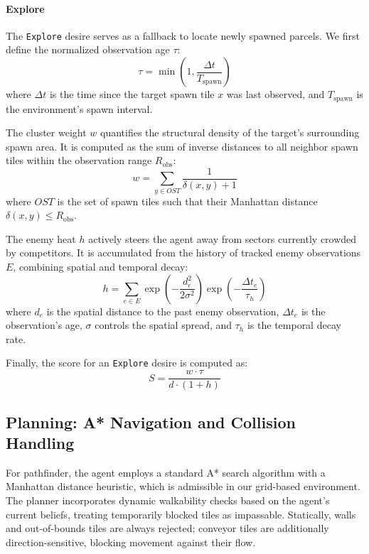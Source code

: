\paragraph{Explore}
The \texttt{Explore} desire serves as a fallback to locate newly spawned parcels. We first define the normalized observation age $\tau$:
\begin{equation*}
  \tau = \min\left(1, \frac{\Delta t}{T_{\text{spawn}}}\right)
\end{equation*}
where $\Delta t$ is the time since the target spawn tile $x$ was last observed, and $T_{\text{spawn}}$ is the environment's spawn interval.

The cluster weight $w$ quantifies the structural density of the target's surrounding spawn area. It is computed as the sum of inverse distances to all neighbor spawn tiles within the observation range $R_{\text{obs}}$:
\begin{equation*}
  w = \sum_{y \in OST} \frac{1}{\delta(x, y) + 1}
\end{equation*}
where $OST$ is the set of spawn tiles such that their Manhattan distance $\delta(x, y) \le R_{\text{obs}}$.

The enemy heat $h$ actively steers the agent away from sectors currently crowded by competitors.
It is accumulated from the history of tracked enemy observations $E$, combining spatial and temporal decay:
\begin{equation*}
  h = \sum_{e \in E} \exp\left(-\frac{d_e^2}{2\sigma^2}\right) \exp\left(-\frac{\Delta t_e}{\tau_h}\right)
\end{equation*}
where $d_e$ is the spatial distance to the past enemy observation, $\Delta t_e$ is the observation's age, $\sigma$ controls the spatial spread, and $\tau_h$ is the temporal decay rate.

Finally, the score for an \texttt{Explore} desire is computed as:
\begin{equation*}
  S = \frac{w \cdot \tau}{d \cdot (1 + h)}
\end{equation*}

\subsection{Planning: A* Navigation and Collision Handling}
\label{sec:planning}

For pathfinder, the agent employs a standard A* search algorithm with a Manhattan distance heuristic, which is admissible in our grid-based environment.
The planner incorporates dynamic walkability checks based on the agent's current beliefs, treating temporarily blocked tiles as impassable.
Statically, walls and out-of-bounds tiles are always rejected; conveyor tiles are additionally direction-sensitive, blocking movement against their flow.

